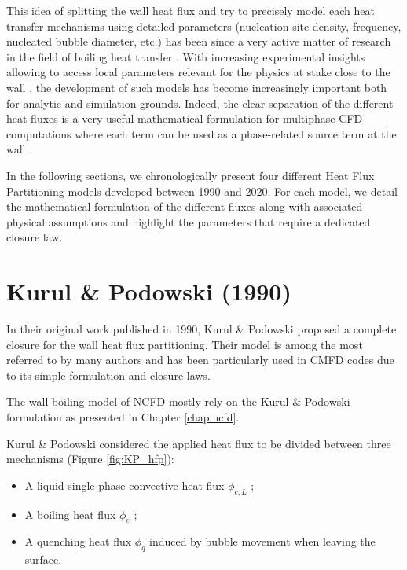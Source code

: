 This idea of splitting the wall heat flux and try to precisely model each heat transfer mechanisms using detailed parameters (nucleation site density, frequency, nucleated bubble diameter, etc.) has been since a very active matter of research in the field of boiling heat transfer \cite{del_valle_subcooled_1985, judd_comprehensive_1976}. With increasing experimental insights allowing to access local parameters relevant for the physics at stake close to the wall \cite{maity_effect_2000, richenderfer_investigation_2018, yoo_experimental_2016, kossolapov_experimental_2021, sugrue_experimental_2014}, the development of such models has become increasingly important both for analytic and simulation grounds. Indeed, the clear separation of the different heat fluxes is a very useful mathematical formulation for multiphase CFD computations where each term can be used as a phase-related source term at the wall \cite{guelfi_neptune_2007, gilman_development_2014}.

\npar

In the following sections, we chronologically present four different Heat Flux Partitioning models developed between 1990 and 2020. For each model, we detail the mathematical formulation of the different fluxes along with associated physical assumptions and highlight the parameters that require a dedicated closure law.


\section{Kurul \& Podowski (1990)}
\label{sec:hfp_kurul}


In their original work published in 1990, Kurul \& Podowski \cite{kurul_multidimensional_1990} proposed a complete closure for the wall heat flux partitioning. Their model is among the most referred to by many authors and has been particularly used in CMFD codes due to its simple formulation and closure laws.

\begin{note*}{}
The wall boiling model of NCFD mostly rely on the Kurul \& Podowski formulation as presented in Chapter \ref{chap:ncfd}.
\end{note*}


Kurul \& Podowski considered the applied heat flux to be divided between three mechanisms (Figure \ref{fig:KP_hfp}):

\begin{itemize}
\item A liquid single-phase convective heat flux $\phi_{c,L}$ ;
\item A boiling heat flux $\phi_{e}$ ;
\item A quenching heat flux $\phi_{q}$ induced by bubble movement when leaving the surface.
\end{itemize}

